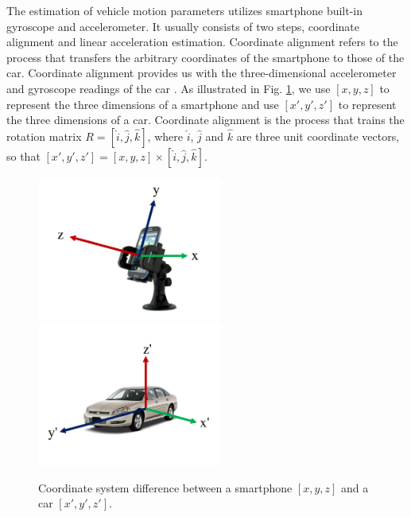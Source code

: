 
The estimation of vehicle motion parameters
utilizes smartphone built-in gyroscope and accelerometer.
It usually consists of two steps, coordinate alignment
and linear acceleration estimation.
Coordinate alignment refers to the process that transfers
the arbitrary coordinates of the smartphone to those of the car.  
Coordinate alignment provides us with the three-dimensional accelerometer
and gyroscope readings of the car \cite{wang2013sensing, hansenspeed}.
As illustrated in Fig. \ref{coordinates}, we use 
$[x, y, z]$ to represent the three dimensions of a smartphone
and use $[x', y', z']$ to represent the three dimensions
of a car. 
Coordinate alignment is the process that trains the rotation
matrix $R = [\hat{i}, \hat{j}, \hat{k}]$, 
where $\hat{i}$, $\hat{j}$ and $\hat{k}$ are three unit coordinate vectors,
so that $[x', y', z'] = [x, y, z] \times [\hat{i}, \hat{j}, \hat{k}]$.

\begin{figure}[!tbph]
	\begin{center}
\includegraphics[width=2.4in,angle=0]{Figs/SlopeAware/phone3d.pdf}
\vspace{0.0cm}
\hspace{-1.0cm}
\includegraphics[width=2.4in,angle=0]{Figs/SlopeAware/car3d.pdf}
\vspace{-0.2cm}
\caption{Coordinate system difference between a smartphone $[x, y, z]$ and a car $[x', y', z']$.}
\vspace{0.2cm}
\label{coordinates}
\end{center}
\end{figure}



